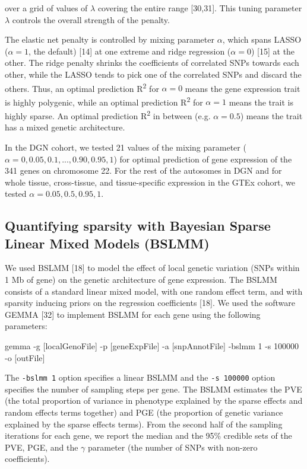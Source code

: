 \documentclass[]{article}
\newenvironment{Shaded}{\begin{snugshade}}{\end{snugshade}}
\newcommand{\DecValTok}[1]{\textcolor[rgb]{0.00,0.00,0.81}{{#1}}}
\newcommand{\NormalTok}[1]{{#1}}
\begin{document}
over a grid of values of \(\lambda\) covering the entire range
{[}30,31{]}. This tuning parameter \(\lambda\) controls the overall
strength of the penalty.

The elastic net penalty is controlled by mixing parameter \(\alpha\),
which spans LASSO (\(\alpha=1\), the default) {[}14{]} at one extreme
and ridge regression (\(\alpha=0\)) {[}15{]} at the other. The ridge
penalty shrinks the coefficients of correlated SNPs towards each other,
while the LASSO tends to pick one of the correlated SNPs and discard the
others. Thus, an optimal prediction R\textsuperscript{2} for
\(\alpha=0\) means the gene expression trait is highly polygenic, while
an optimal prediction R\textsuperscript{2} for \(\alpha=1\) means the
trait is highly sparse. An optimal prediction R\textsuperscript{2} in
between (e.g. \(\alpha=0.5\)) means the trait has a mixed genetic
architecture.

In the DGN cohort, we tested 21 values of the mixing parameter
(\(\alpha=0, 0.05, 0.1, ..., 0.90, 0.95, 1\)) for optimal prediction of
gene expression of the 341 genes on chromosome 22. For the rest of the
autosomes in DGN and for whole tissue, cross-tissue, and tissue-specific
expression in the GTEx cohort, we tested \(\alpha=0.05, 0.5, 0.95, 1\).

\subsection{Quantifying sparsity with Bayesian Sparse Linear Mixed
Models
(BSLMM)}\label{quantifying-sparsity-with-bayesian-sparse-linear-mixed-models-bslmm}

We used BSLMM {[}18{]} to model the effect of local genetic variation
(SNPs within 1 Mb of gene) on the genetic architecture of gene
expression. The BSLMM consists of a standard linear mixed model, with
one random effect term, and with sparsity inducing priors on the
regression coefficients {[}18{]}. We used the software GEMMA {[}32{]} to
implement BSLMM for each gene using the following parameters:

\begin{Shaded}
\begin{Highlighting}[]
\NormalTok{gemma -g [localGenoFile] -p [geneExpFile] -a [snpAnnotFile] -bslmm }\DecValTok{1} \NormalTok{-s }\DecValTok{100000} \NormalTok{-o [outFile]}
\end{Highlighting}
\end{Shaded}

The \texttt{-bslmm 1} option specifies a linear BSLMM and the
\texttt{-s 100000} option specifies the number of sampling steps per
gene. The BSLMM estimates the PVE (the total proportion of variance in
phenotype explained by the sparse effects and random effects terms
together) and PGE (the proportion of genetic variance explained by the
sparse effects terms). From the second half of the sampling iterations
for each gene, we report the median and the 95\% credible sets of the
PVE, PGE, and the \textbar{}\(\gamma\)\textbar{} parameter (the number
of SNPs with non-zero coefficients).
\end{document}
